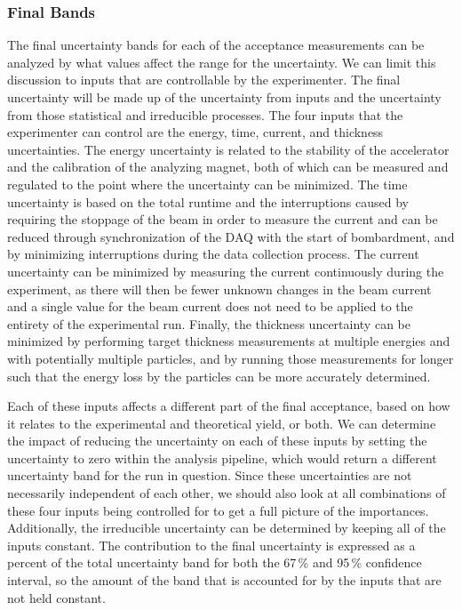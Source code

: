 \subsubsection{Final Bands}
The final uncertainty bands for each of the acceptance measurements can
be analyzed by what values affect the range for the uncertainty. We can
limit this discussion to inputs that are controllable by the
experimenter. The final uncertainty will be made up of the uncertainty
from inputs and the uncertainty from those statistical and irreducible
processes. The four inputs that the experimenter can control are the
energy, time, current, and thickness uncertainties. The energy
uncertainty is related to the stability of the accelerator and the
calibration of the analyzing magnet, both of which can be measured and
regulated to the point where the uncertainty can be minimized. The time
uncertainty is based on the total runtime and the interruptions caused
by requiring the stoppage of the beam in order to measure the current
and can be reduced through synchronization of the DAQ with the start of
bombardment, and by minimizing interruptions during the data collection
process. The current uncertainty can be minimized by measuring the
current continuously during the experiment, as there will then be fewer
unknown changes in the beam current and a single value for the beam
current does not need to be applied to the entirety of the experimental
run. Finally, the thickness uncertainty can be minimized by performing
target thickness measurements at multiple energies and with potentially
multiple particles, and by running those measurements for longer such
that the energy loss by the particles can be more accurately determined.

Each of these inputs affects a different part of the final acceptance,
based on how it relates to the experimental and theoretical yield, or
both. We can determine the impact of reducing the uncertainty on each of
these inputs by setting the uncertainty to zero within the analysis
pipeline, which would return a different uncertainty band for the run in
question. Since these uncertainties are not necessarily independent of
each other, we should also look at all combinations of these four inputs
being controlled for to get a full picture of the importances.
Additionally, the irreducible uncertainty can be determined by keeping
all of the inputs constant. The contribution to the final uncertainty is
expressed as a percent of the total uncertainty band for both the 67\,\%
and 95\,\% confidence interval, so the amount of the band that is
accounted for by the inputs that are not held constant.

